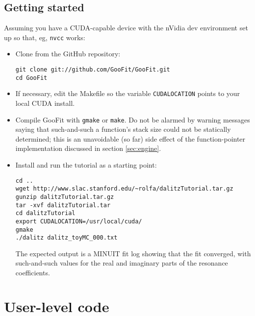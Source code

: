 \documentclass[12pt,pdflatex]{article}
\begin{document}
\subsection{Getting started}

Assuming you have a CUDA-capable device with the nVidia dev environment
set up so that, eg, \texttt{nvcc} works:
\begin{itemize}
\item Clone from the GitHub repository:
\begin{verbatim}
git clone git://github.com/GooFit/GooFit.git
cd GooFit
\end{verbatim}
\item If necessary, edit the Makefile so the variable \texttt{CUDALOCATION}
points to your local CUDA install.
\item Compile GooFit with \texttt{gmake} or \texttt{make}. Do not be alarmed
by warning messages saying that such-and-such a function's stack size could
not be statically determined; this is an unavoidable (so far) side effect 
of the function-pointer implementation discussed in section \ref{sec:engine}.
\item Install and run the tutorial as a starting point:
\begin{verbatim}
cd ..
wget http://www.slac.stanford.edu/~rolfa/dalitzTutorial.tar.gz
gunzip dalitzTutorial.tar.gz
tar -xvf dalitzTutorial.tar
cd dalitzTutorial
export CUDALOCATION=/usr/local/cuda/
gmake
./dalitz dalitz_toyMC_000.txt
\end{verbatim}
The expected output is a MINUIT fit log showing that the fit
converged, with such-and-such values for the real and imaginary
parts of the resonance coefficients. 
\end{itemize}

\section{User-level code}
\label{sec:usercode}
\end{document}
